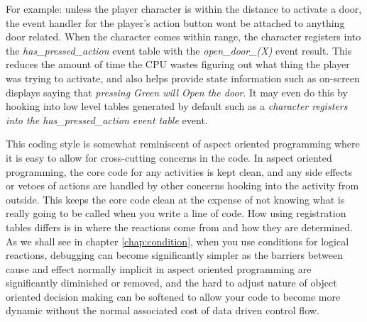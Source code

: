 For example: unless the player character is within the distance to activate a
door, the event handler for the player's action button wont be attached to
anything door related. When the character comes within range, the character
registers into the \emph{has\_pressed\_action} event table with the
\emph{open\_door\_(X)} event result. This reduces the amount of time the
CPU wastes figuring out what thing the player was trying to activate, and also
helps provide state information such as on-screen displays saying that
\emph{pressing Green will Open the door}. It may even do this by hooking into
low level tables generated by default such as a \emph{character registers into
the has\_pressed\_action event table} event.

This coding style is somewhat reminiscent of aspect oriented programming where
it is easy to allow for cross-cutting concerns in the code. In aspect oriented
programming, the core code for any activities is kept clean, and any side
effects or vetoes of actions are handled by other concerns hooking into the
activity from outside. This keeps the core code clean at the expense of not
knowing what is really going to be called when you write a line of code. How
using registration tables differs is in where the reactions come from and how
they are determined. As we shall see in chapter \ref{chap:condition}, when you
use conditions for logical reactions, debugging can become significantly
simpler as the barriers between cause and effect normally implicit in aspect
oriented programming are significantly diminished or removed, and the hard to
adjust nature of object oriented decision making can be softened to allow your
code to become more dynamic without the normal associated cost of data driven
control flow.


